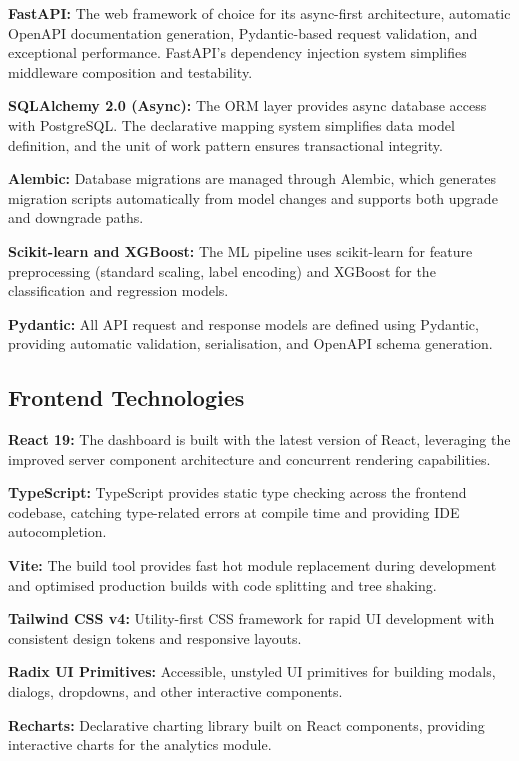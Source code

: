 \documentclass[oneside,12pt,a4paper]{report}
\begin{document}
\textbf{FastAPI:} The web framework of choice for its async-first architecture, automatic OpenAPI documentation generation, Pydantic-based request validation, and exceptional performance. FastAPI's dependency injection system simplifies middleware composition and testability.

\textbf{SQLAlchemy 2.0 (Async):} The ORM layer provides async database access with PostgreSQL. The declarative mapping system simplifies data model definition, and the unit of work pattern ensures transactional integrity.

\textbf{Alembic:} Database migrations are managed through Alembic, which generates migration scripts automatically from model changes and supports both upgrade and downgrade paths.

\textbf{Scikit-learn and XGBoost:} The ML pipeline uses scikit-learn for feature preprocessing (standard scaling, label encoding) and XGBoost for the classification and regression models.

\textbf{Pydantic:} All API request and response models are defined using Pydantic, providing automatic validation, serialisation, and OpenAPI schema generation.

\subsection{Frontend Technologies}

\textbf{React 19:} The dashboard is built with the latest version of React, leveraging the improved server component architecture and concurrent rendering capabilities.

\textbf{TypeScript:} TypeScript provides static type checking across the frontend codebase, catching type-related errors at compile time and providing IDE autocompletion.

\textbf{Vite:} The build tool provides fast hot module replacement during development and optimised production builds with code splitting and tree shaking.

\textbf{Tailwind CSS v4:} Utility-first CSS framework for rapid UI development with consistent design tokens and responsive layouts.

\textbf{Radix UI Primitives:} Accessible, unstyled UI primitives for building modals, dialogs, dropdowns, and other interactive components.

\textbf{Recharts:} Declarative charting library built on React components, providing interactive charts for the analytics module.
\end{document}
